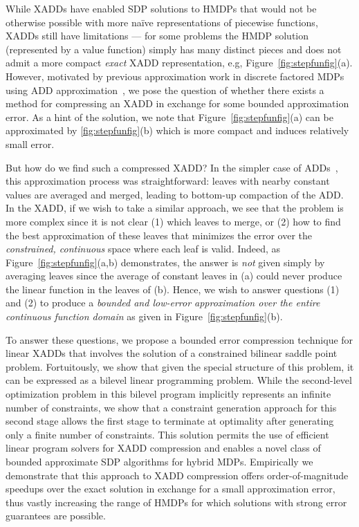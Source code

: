 While XADDs have enabled SDP solutions to HMDPs that would not be
otherwise possible with more na\"{i}ve representations of piecewise
functions, XADDs still have limitations --- for some problems the HMDP
solution (represented by a value function) simply has many distinct
pieces and does not admit a more compact \emph{exact} XADD
representation, e.g, Figure~\ref{fig:stepfunfig}(a).  However,
motivated by previous approximation work in discrete factored MDPs
using ADD approximation~\cite{apricodd}, we pose the question of
whether there exists a method for compressing an XADD in exchange
for some bounded approximation error.  As a hint of the solution, we
note that Figure~\ref{fig:stepfunfig}(a) can be approximated
by \ref{fig:stepfunfig}(b) which is more compact and induces relatively 
small error.  

But how do we find such a compressed XADD?  In the simpler case of
ADDs~\cite{apricodd}, this approximation process was straightforward:
leaves with nearby constant values are averaged and merged, leading to
bottom-up compaction of the ADD.  In the XADD, if we wish to take a
similar approach, we see that the problem is more complex since it is
not clear (1) which leaves to merge, or (2) how to find the best
approximation of these leaves that minimizes the error over the
\emph{constrained, continuous} space where each leaf is valid.  Indeed, as
Figure~\ref{fig:stepfunfig}(a,b) demonstrates, the answer
is \emph{not} given simply by averaging leaves since the average of
constant leaves in (a) could never produce the linear function in the
leaves of (b).  Hence, we wish to answer questions (1) and (2) to
produce a \emph{bounded and low-error approximation over the entire
continuous function domain} as given in
Figure~\ref{fig:stepfunfig}(b).

To answer these questions, we propose a bounded error compression
technique for linear XADDs that involves the solution of a constrained
bilinear saddle point problem.  Fortuitously, we show that given the
special structure of this problem, it can be expressed as a bilevel
linear programming problem. %
While the second-level optimization problem in this
bilevel program implicitly represents an infinite number of
constraints, we show that a constraint generation approach for 
this second stage allows the first stage to terminate at
optimality after generating only a finite number of constraints.  This
solution permits the use of efficient linear program solvers for XADD
compression and enables a novel class of bounded approximate SDP
algorithms for hybrid MDPs.  Empirically we demonstrate that this
approach to XADD compression offers order-of-magnitude speedups over
the exact solution in exchange for a small approximation error, thus
vastly increasing the range of HMDPs for which solutions with strong
error guarantees are possible.

